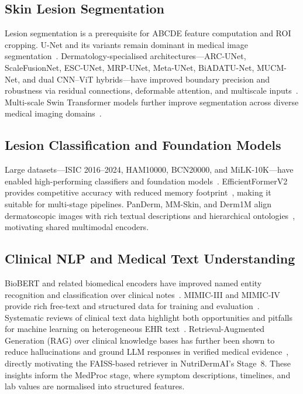 \documentclass[conference]{IEEEtran}
\begin{document}
\subsection{Skin Lesion Segmentation}

Lesion segmentation is a prerequisite for ABCDE feature computation
and ROI cropping. U-Net and its variants remain dominant in medical
image segmentation~\cite{ronneberger2015_unet,reviewunet2024_unetreview}.
Dermatology-specialised architectures---ARC-UNet, ScaleFusionNet,
ESC-UNet, MRP-UNet, Meta-UNet, BiADATU-Net, MUCM-Net, and dual
CNN--ViT hybrids---have improved boundary precision and robustness via
residual connections, deformable attention, and multiscale
inputs~\cite{arcunet2024_arcunet,scalefusionnet2025,escunet2025,
mrpunet2025,metaunet2025,biadatu2024,mucmnet2024,hybriddualencoder2024}.
Multi-scale Swin Transformer models further improve segmentation across
diverse medical imaging
domains~\cite{swinmedical2025,attentionreview2023}.

\subsection{Lesion Classification and Foundation Models}

Large datasets---ISIC 2016--2024, HAM10000, BCN20000, and
MiLK-10K---have enabled high-performing classifiers and foundation
models~\cite{isic2016_2024_datasets,tschsandl2018_ham10000,
combalia2019_bcn20000,milk10k2021_milk10k}. EfficientFormerV2 provides
competitive accuracy with reduced memory
footprint~\cite{yu2022_efficientformerv2}, making it suitable for
multi-stage pipelines. PanDerm, MM-Skin, and Derm1M align dermatoscopic
images with rich textual descriptions and hierarchical
ontologies~\cite{pan2025_panderm,zeng2025_mmskin,yan2025_derm1m,
aboulmira2025_attentionmultiskin}, motivating shared multimodal encoders.

\subsection{Clinical NLP and Medical Text Understanding}

BioBERT and related biomedical encoders have improved named entity
recognition and classification over clinical
notes~\cite{lee2020_biobert}. MIMIC-III and MIMIC-IV provide rich
free-text and structured data for training and
evaluation~\cite{johnson2016_mimic3,hyland2023_mimic4note}. Systematic
reviews of clinical text data highlight both opportunities and pitfalls
for machine learning on heterogeneous EHR
text~\cite{clinicaltextreview2020t}. Retrieval-Augmented Generation
(RAG) over clinical knowledge bases has further been shown to reduce
hallucinations and ground LLM responses in verified medical
evidence~\cite{lewis2020_rag,xiong2024_benchmarking_rag_medical},
directly motivating the FAISS-based retriever in NutriDermAI's Stage~8.
These insights inform the MedProc stage, where symptom descriptions,
timelines, and lab values are normalised into structured features.
\end{document}
